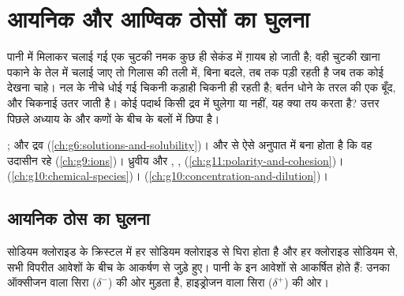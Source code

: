 \chapter{आयनिक और आण्विक ठोसों का घुलना}\label{ch:g11:dissolution}

पानी में मिलाकर चलाई गई एक चुटकी नमक कुछ ही सेकंड में ग़ायब हो जाती है; वही
चुटकी खाना पकाने के तेल में चलाई जाए तो गिलास की तली में, बिना बदले, तब तक
पड़ी रहती है जब तक कोई देखना चाहे। नल के नीचे धोई गई चिकनी कड़ाही चिकनी ही रहती
है; बर्तन धोने के तरल की एक बूँद, और चिकनाई उतर जाती है। कोई पदार्थ किसी द्रव में
घुलेगा या नहीं, यह क्या तय करता है? उत्तर पिछले अध्याय के  और
कणों के बीच के बलों में छिपा है।

\begin{recall}
;  और  द्रव
(\cref{ch:g6:solutions-and-solubility})।   और  से
ऐसे अनुपात में बना होता है कि वह उदासीन रहे
(\cref{ch:g9:ions})। ध्रुवीय और , ,
 (\cref{ch:g11:polarity-and-cohesion})।
 (\cref{ch:g10:chemical-species})।  (\cref{ch:g10:concentration-and-dilution})।
\end{recall}

\section{आयनिक ठोस का घुलना}

सोडियम क्लोराइड के क्रिस्टल में हर सोडियम   क्लोराइड  
से घिरा होता है और हर क्लोराइड  सोडियम  से, सभी विपरीत आवेशों के बीच के
आकर्षण से जुड़े हुए। पानी के  इन आवेशों से आकर्षित होते हैं: उनका
ऑक्सीजन वाला सिरा ($\delta^-$)  की ओर मुड़ता है, हाइड्रोजन वाला सिरा
($\delta^+$)  की ओर।


